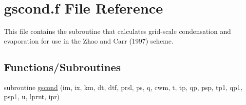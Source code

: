 \hypertarget{gscond_8f}{}\section{gscond.\+f File Reference}
\label{gscond_8f}


This file contains the subroutine that calculates grid-\/scale condensation and evaporation for use in the Zhao and Carr (1997) \cite{zhao_and_carr_1997} scheme.  


\subsection*{Functions/\+Subroutines}
\textbf{ }\par
\begin{DoxyCompactItemize}
\item 
subroutine \hyperlink{group__condense_gac51672b28449a810caf82a7292078ccf}{gscond} (im, ix, km, dt, dtf, prsl, ps, q, cwm, t, tp, qp, psp, tp1, qp1, psp1, u, lprnt, ipr)
\end{DoxyCompactItemize}

